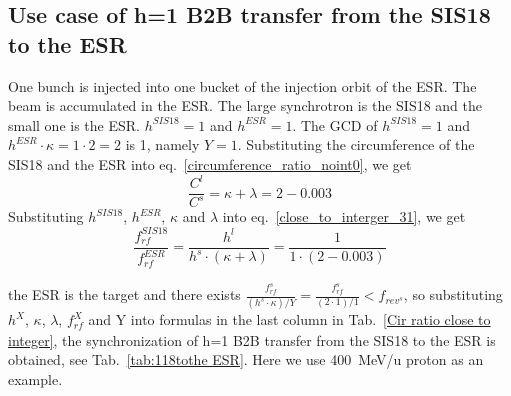 \subsection{Use case of h=1 B2B transfer from the SIS18 to the ESR} 
One bunch is injected into one bucket of the injection orbit of the ESR. The beam is accumulated in the ESR. The large synchrotron is the SIS18 and the small one is the ESR. $h^{\mathit{SIS18}}=1$ and $h^{\mathit{ESR}}=1$. The GCD of $h^{\mathit{SIS18}}=1$ and $h^{\mathit{ESR}}\cdot \kappa=1\cdot 2=2$ is 1, namely $Y=1$. Substituting the circumference of the SIS18 and the ESR into eq.~\ref{circumference_ratio_noint0}, we get
\begin{equation}
\frac{C^l}{C^s}=\kappa + \lambda =2-0.003
\end{equation}
Substituting $h^{\mathit{SIS18}}$, $h^{\mathit{ESR}}$, $\kappa$ and $\lambda$ into eq.~\ref{close_to_interger_31}, we get
\begin{equation}
\frac {f_{\mathit{rf}}^{\mathit{SIS18}}}{f_{\mathit{rf}}^{\mathit{ESR}}}= \frac{h^l}{h^s \cdot (\kappa+ \lambda)}=\frac {1}{1 \cdot(2-0.003)}
\end{equation}

the ESR is the target and there exists $\frac{f_{\mathit{rf}}^{s}}{(h^s \cdot\kappa)/Y}=\frac{f_{\mathit{rf}}^{s}}{(2 \cdot 1)/1}<f_{\mathit{rev}^s}$, so substituting $h^X$, $\kappa$, $\lambda$, $f_{\mathit{rf}}^{X}$ and Y into formulas in the last column in Tab.~\ref{Cir ratio close to integer}, the synchronization of h=1 B2B transfer from the SIS18 to the ESR is obtained, see Tab.~\ref{tab:118tothe ESR}. Here we use \SI{400}{MeV/\atomicmassunit} proton as an example. 

